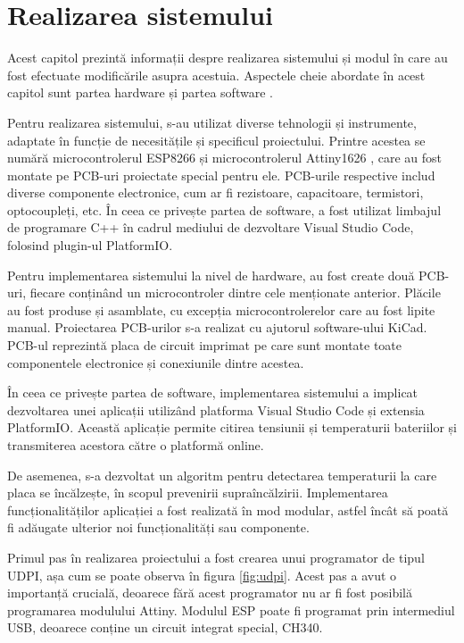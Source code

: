 \clearpage
\section{Realizarea sistemului}

Acest capitol prezintă informații despre realizarea sistemului și modul în care au fost efectuate modificările asupra acestuia. Aspectele cheie abordate în acest capitol sunt partea hardware \cite{bmshard} și partea software \cite{bmssoft} \cite{bmssoft32}.

Pentru realizarea sistemului, s-au utilizat diverse tehnologii și instrumente, adaptate în funcție de necesitățile și specificul proiectului. Printre acestea se numără microcontrolerul ESP8266 \cite{esp8266-datasheet} și microcontrolerul Attiny1626 \cite{attiny1626-datasheet}, care au fost montate pe PCB-uri proiectate special pentru ele. PCB-urile respective includ diverse componente electronice, cum ar fi rezistoare, capacitoare, termistori, optocoupleți, etc. În ceea ce privește partea de software, a fost utilizat limbajul de programare C++ în cadrul mediului de dezvoltare Visual Studio Code, folosind plugin-ul PlatformIO.

Pentru implementarea sistemului la nivel de hardware, au fost create două PCB-uri, fiecare conținând un microcontroler dintre cele menționate anterior. Plăcile au fost produse și asamblate, cu excepția microcontrolerelor care au fost lipite manual. Proiectarea PCB-urilor s-a realizat cu ajutorul software-ului KiCad. PCB-ul reprezintă placa de circuit imprimat pe care sunt montate toate componentele electronice și conexiunile dintre acestea.

În ceea ce privește partea de software, implementarea sistemului a implicat dezvoltarea unei aplicații utilizând platforma Visual Studio Code și extensia PlatformIO. Această aplicație permite citirea tensiunii și temperaturii bateriilor și transmiterea acestora către o platformă online.

De asemenea, s-a dezvoltat un algoritm pentru detectarea temperaturii la care placa se încălzește, în scopul prevenirii supraîncălzirii. Implementarea funcționalităților aplicației a fost realizată în mod modular, astfel încât să poată fi adăugate ulterior noi funcționalități sau componente.

Primul pas în realizarea proiectului a fost crearea unui programator de tipul UDPI, așa cum se poate observa în figura \ref{fig:udpi}. Acest pas a avut o importanță crucială, deoarece fără acest programator nu ar fi fost posibilă programarea modulului Attiny. Modulul ESP poate fi programat prin intermediul USB, deoarece conține un circuit integrat special, CH340.

